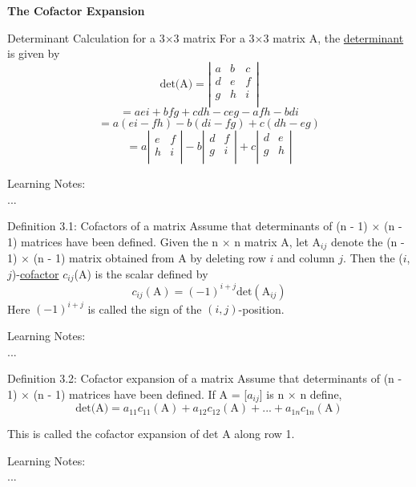 \documentclass[
  12pt,
  a4paper,
]{article}
\begin{document}
\noindent
\textbf{The Cofactor Expansion}

\begin{box_cyan}{Determinant Calculation for a 3×3 matrix
}
For a 3×3 matrix A, the \underline{determinant} is given by
$$\text{det(A)} = \left|\begin{matrix}a&b&c\\d&e&f\\g&h&i\\\end{matrix}\right|$$
$$=aei+bfg+cdh-ceg-afh-bdi$$
$$=a\left(ei-fh\right)-b\left(di-fg\right)+c\left(dh-eg\right)$$
$$=a\left|\begin{matrix}e&f\\h&i\\\end{matrix}\right|-b\left|\begin{matrix}d&f\\g&i\\\end{matrix}\right|+c\left|\begin{matrix}d&e\\g&h\\\end{matrix}\right|$$
\end{box_cyan}
\noindent
Learning Notes:
\\...

\begin{box_cyan}{Definition 3.1: Cofactors of a matrix }
Assume that determinants of (n - 1) × (n - 1) matrices have been defined. Given the n × n matrix A, let
A$_{ij}$ denote the (n - 1) × (n - 1) matrix obtained from A by deleting row $i$ and column $j$. Then the ($i$, $j$)-\underline{cofactor} $c_{ij}$(A) is the scalar defined by
$$c_{ij}(\text{A}) = (-1)^{i+j} \text{det}(\text{A}_{ij})$$
Here $(-1)^{i+j}$ is called the sign of the $(i, j)$-position.
\end{box_cyan}
\noindent
Learning Notes:
\\...

\begin{box_cyan}{Definition 3.2: Cofactor expansion of a matrix}
Assume that determinants of (n - 1) × (n - 1) matrices have been defined. If A = [$a_{ij}$] is n × n define,
$$\text{det(A)} = a_{11}c_{11}(\text{A}) + a_{12}c_{12}(\text{A}) + ... + a_{1n}c_{1n}(\text{A})$$

This is called the cofactor expansion of det A along row 1.
\end{box_cyan}
\noindent
Learning Notes:
\\...
\end{document}
